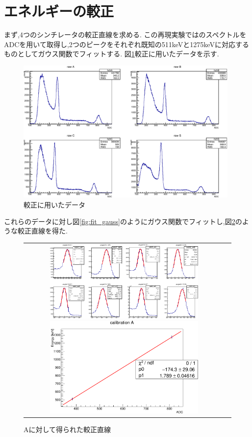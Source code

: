 \section{エネルギーの較正}
まず,4つのシンチレータの較正直線を求める.
この再現実験ではのスペクトルをADCを用いて取得し,2つのピークをそれぞれ既知の511keVと1275keVに対応するものとしてガウス関数でフィットする.
図\ref{fig:calibration_raw_data}較正に用いたデータを示す.
\begin{figure}[H]
	\centering
		\includegraphics[width=11cm]{fig/isb/cal7001.pdf}
		\caption{較正に用いたデータ}
		\label{fig:calibration_raw_data}
\end{figure}
これらのデータに対し図\ref{fig:fit_gauss}のようにガウス関数でフィットし,図\ref{fig:fitA}のような較正直線を得た.
\begin{figure}[htbp]
	\begin{tabular}{cc}
		\begin{minipage}{0.5\hsize}
			\centering
				\includegraphics[width=80mm]{fig/isb/gaussFit.pdf}
				\caption{ガウス関数によるフィッティング}
				\label{fig:fit_gauss}
		\end{minipage}
		\begin{minipage}{0.5\hsize}
			\centering
				\includegraphics[width=80mm]{fig/isb/fitA.pdf}
				\caption{Aに対して得られた較正直線}
				\label{fig:fitA}
		\end{minipage}
	\end{tabular}
\end{figure}
